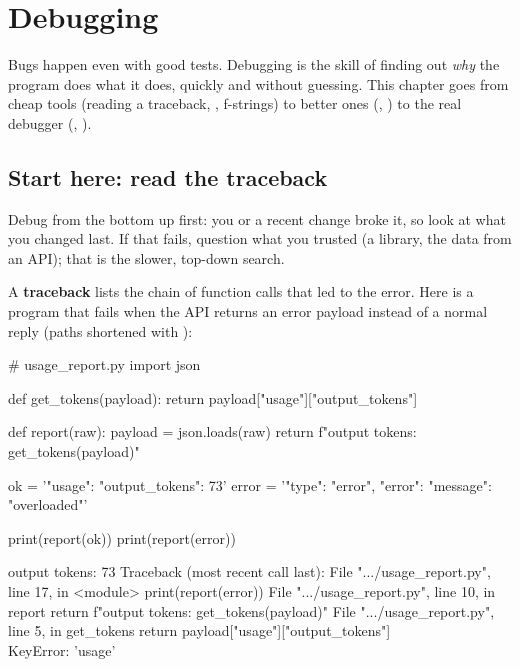 \chapter{Debugging}

\usetikzlibrary{shapes.geometric}

Bugs happen even with good tests. Debugging is the skill of finding out \emph{why} the program does what it does,
quickly and without guessing. This chapter goes from cheap tools (reading a traceback, , f-strings) to
better ones (, ) to the real debugger (, ).

\section{Start here: read the traceback}

Debug from the bottom up first: you or a recent change broke it, so look at what you changed last.
If that fails, question what you trusted (a library, the data from an API); that is the slower, top-down search.

A \textbf{traceback} lists the chain of function calls that led to the error. Here is a program that fails when the API returns an
error payload instead of a normal reply (paths shortened with ):

\begin{pycode}
# usage_report.py
import json

def get_tokens(payload):
    return payload["usage"]["output_tokens"]

def report(raw):
    payload = json.loads(raw)
    return f"output tokens: {get_tokens(payload)}"

ok = '{"usage": {"output_tokens": 73}}'
error = '{"type": "error", "error": {"message": "overloaded"}}'

print(report(ok))
print(report(error))
\end{pycode}
\begin{rawcode}
output tokens: 73
Traceback (most recent call last):
  File ".../usage_report.py", line 17, in <module>
    print(report(error))
  File ".../usage_report.py", line 10, in report
    return f"output tokens: {get_tokens(payload)}"
  File ".../usage_report.py", line 5, in get_tokens
    return payload["usage"]["output_tokens"]
           ~~~~~~~^^^^^^^^^
KeyError: 'usage'
\end{rawcode}

